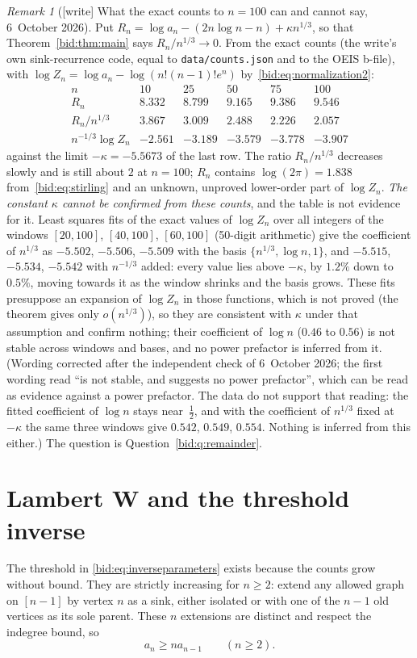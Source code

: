 \documentclass[11pt,letterpaper]{article}
\numberwithin{equation}{section}
\theoremstyle{remark}\newtheorem{remark}[theorem]{Remark}
\newcommand{\file}[1]{\nolinkurl{#1}}
\begin{document}
\begin{remark}[{[write]} What the exact counts to $n=100$ can and cannot say, 6~October 2026]\label{bid:rem:finite}
Put $R_n=\log a_n-(2n\log n-n)+\kappa n^{1/3}$, so that
Theorem~\ref{bid:thm:main} says $R_n/n^{1/3}\to0$. From the exact counts
(the write's own sink-recurrence code, equal to \file{data/counts.json} and
to the OEIS b-file), with $\log Z_n=\log a_n-\log(n!(n-1)!e^n)$
by~\eqref{bid:eq:normalization2}:
\[
\begin{array}{c|ccccc}
n&10&25&50&75&100\\\hline
R_n&8.332&8.799&9.165&9.386&9.546\\
R_n/n^{1/3}&3.867&3.009&2.488&2.226&2.057\\
n^{-1/3}\log Z_n&-2.561&-3.189&-3.579&-3.778&-3.907
\end{array}
\]
against the limit $-\kappa=-5.5673$ of the last row. The ratio
$R_n/n^{1/3}$ decreases slowly and is still about $2$ at $n=100$; $R_n$
contains $\log(2\pi)=1.838$ from~\eqref{bid:eq:stirling} and an unknown,
unproved lower-order part of $\log Z_n$. \emph{The constant $\kappa$ cannot be
confirmed from these counts}, and the table is not evidence for it. Least
squares fits of the exact values of $\log Z_n$ over all integers of the
windows $[20,100]$, $[40,100]$, $[60,100]$ (50-digit arithmetic) give the
coefficient of $n^{1/3}$ as $-5.502$, $-5.506$, $-5.509$ with the basis
$\{n^{1/3},\log n,1\}$, and $-5.515$, $-5.534$, $-5.542$ with $n^{-1/3}$ added:
every value lies above $-\kappa$, by $1.2\%$ down to $0.5\%$, moving towards it
as the window shrinks and the basis grows. These fits presuppose an
expansion of $\log Z_n$ in those functions, which is not proved (the theorem
gives only $o(n^{1/3})$), so they are consistent with $\kappa$ under that
assumption and confirm nothing; their coefficient of $\log n$ ($0.46$ to
$0.56$) is not stable across windows and bases, and no power prefactor is
inferred from it. \textup{(Wording corrected after the independent check of
6~October 2026; the first wording read ``is not stable, and suggests no power
prefactor'', which can be read as evidence against a power prefactor. The data
do not support that reading: the fitted coefficient of $\log n$ stays
near~$\frac12$, and with the coefficient of $n^{1/3}$ fixed at $-\kappa$ the
same three windows give $0.542$, $0.549$, $0.554$. Nothing is inferred from
this either.)} The question is
Question~\ref{bid:q:remainder}.
\end{remark}

\section{Lambert W and the threshold inverse}\label{bid:sec:inverse}
The threshold in \eqref{bid:eq:inverseparameters} exists because the counts
grow without bound. They are strictly increasing for $n\geq2$: extend
any allowed graph on $[n-1]$ by vertex $n$ as a sink, either isolated or
with one of the $n-1$ old vertices as its sole parent. These $n$
extensions are distinct and respect the indegree bound, so
\begin{equation}\label{bid:eq:monotonicity}
 a_n\geq n a_{n-1}\qquad(n\geq2).
\end{equation}
\end{document}
